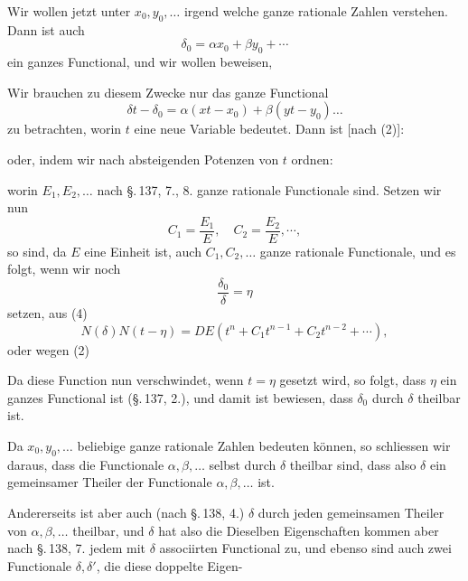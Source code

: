 
Wir wollen jetzt unter $x_0, y_0, \dots$ irgend welche ganze rationale Zahlen verstehen. Dann ist auch
\[ \delta_0 = \alpha x_0 + \beta y_0 + \cdots \]
ein ganzes Functional, und wir wollen beweisen, 

Wir brauchen zu diesem Zwecke nur das ganze Functional
\[ \delta t - \delta_0 = \alpha (x t - x_0) + \beta (y t - y_0) \dots \]
zu betrachten, worin $t$ eine neue Variable bedeutet. Dann ist [nach (2)]:


oder, indem wir nach absteigenden Potenzen von $t$ ordnen:


worin $E_1, E_2, \dots$ nach \S.\,137, 7., 8. ganze rationale Functionale sind. Setzen wir nun
\[ C_1 = \frac{E_1}{E}, \quad C_2 = \frac{E_2}{E}, \cdots, \]
so sind, da $E$ eine Einheit ist, auch $C_1, C_2, \dots$ ganze rationale Functionale, und es folgt, wenn wir noch
\[ \frac{\delta_0}{\delta} = \eta \]
setzen, aus (4)
\[ N (\delta) N (t - \eta) = D E (t^n + C_1 t^{n-1} + C_2 t^{n-2} + \cdots), \]
oder wegen (2)


Da diese Function nun verschwindet, wenn $t = \eta$ gesetzt wird, so folgt, dass $\eta$ ein ganzes Functional ist (\S.\,137, 2.), und damit ist bewiesen, dass $\delta_0$ durch $\delta$ theilbar ist.

Da $x_0, y_0, \dots$ beliebige ganze rationale Zahlen bedeuten können, so schliessen wir daraus, dass die Functionale $\alpha, \beta, \dots$ selbst durch $\delta$ theilbar sind, dass also $\delta$ ein gemeinsamer Theiler der Functionale $\alpha, \beta, \dots$ ist.

Andererseits ist aber auch (nach \S.\,138, 4.) $\delta$ durch jeden gemeinsamen Theiler von $\alpha, \beta, \dots$ theilbar, und $\delta$ hat also die  Dieselben Eigenschaften kommen aber nach \S.\,138, 7. jedem mit $\delta$ associirten Functional zu, und ebenso sind auch zwei Functionale $\delta, \delta'$, die diese doppelte Eigen-
